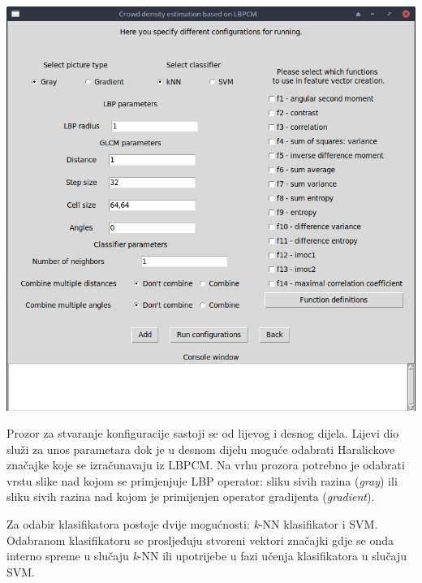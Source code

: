 \documentclass[times, utf8, zavrsni]{fer}
\begin{document}
\begin{minipage}{\linewidth}
\centering
\includegraphics[scale=0.35]{img/fvc2.png}
\end{minipage}

\bigbreak

Prozor za stvaranje konfiguracije sastoji se od lijevog i desnog dijela. 
Lijevi dio služi za unos parametara dok je u desnom dijelu moguće odabrati
Haralickove značajke koje se izračunavaju iz LBPCM. Na vrhu prozora potrebno
je odabrati vrstu slike nad kojom se primjenjuje LBP operator: sliku 
sivih razina (\textit{gray}) ili sliku sivih razina nad kojom je 
primijenjen operator gradijenta (\textit{gradient}). 

\bigbreak

Za odabir klasifikatora postoje dvije mogućnosti: \textit{k}-NN klasifikator i 
SVM. Odabranom klasifikatoru se prosljeđuju stvoreni vektori značajki gdje se onda
interno spreme u slučaju \textit{k}-NN ili upotrijebe u fazi učenja klasifikatora
u slučaju SVM. 
\end{document}

